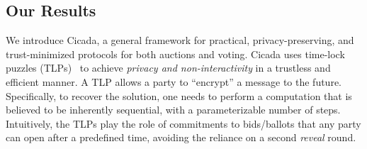 \subsection{Our Results}

We introduce Cicada, a general framework for practical, privacy-preserving, and trust-minimized protocols for both auctions and voting. 
Cicada uses time-lock puzzles (TLPs)~\cite{RSW96} to achieve \emph{privacy and non-interactivity} in a trustless and efficient manner.
A TLP allows a party to ``encrypt'' a message to the future. Specifically, to recover the solution, one needs to perform a computation that is believed to be inherently sequential, with a parameterizable number of steps.
Intuitively, the TLPs play the role of commitments to bids/ballots that any party can open after a predefined time, avoiding the reliance on a second \emph{reveal} round. 


